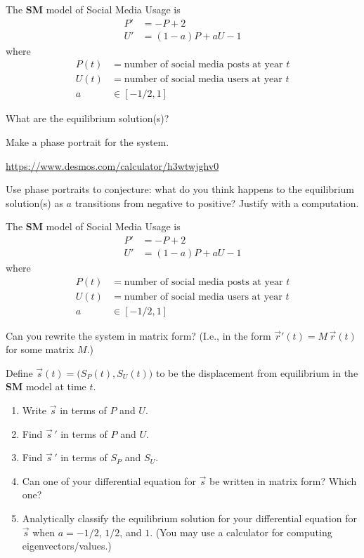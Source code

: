 \documentclass{workbook}
\begin{document}
\begin{slide}
	\question
	The \textbf{SM} model of Social Media Usage is
	\begin{align*}
		P'&=-P+2\\
		U'&=(1-a)P + aU - 1
	\end{align*}
	where
	\begin{align*}
		P(t) &= \text{number of social media posts at year $t$}\\
		U(t) &= \text{number of social media users at year $t$}\\
		a &\in [-1/2, 1]
	\end{align*}

	\begin{parts}
		\item What are the equilibrium solution(s)?
		\item Make a phase portrait for the system.
		
		{\small \url{https://www.desmos.com/calculator/h3wtwjghv0}}
		\item Use phase portraits to conjecture: what do you think happens to the equilibrium
			solution(s) as $a$ transitions from negative to positive? Justify with a computation.
	\end{parts}
\end{slide}

\begin{slide}
	\question
	The \textbf{SM} model of Social Media Usage is
	\begin{align*}
		P'&=-P+2\\
		U'&=(1-a)P + aU - 1
	\end{align*}
	where
	\begin{align*}
		P(t) &= \text{number of social media posts at year $t$}\\
		U(t) &= \text{number of social media users at year $t$}\\
		a &\in [-1/2, 1]
	\end{align*}

	\begin{parts}
		\item Can you rewrite the system in matrix form? (I.e., in the form $\vec r'(t) = M\, \vec r(t)$ for some matrix $M$.)
		\item Define $\vec s(t)=\Big(S_P(t),S_U(t)\Big)$  to be the displacement from equilibrium in the \textbf{SM} model at time $t$.
		\begin{enumerate}
			\item Write $\vec s$ in terms of $P$ and $U$.
			\item Find $\vec s\,'$ in terms of $P$ and $U$.
			\item Find $\vec s\,'$ in terms of $S_P$ and $S_U$.
			\item Can one of your differential equation for $\vec s$ be written in matrix form? Which one?
			\item Analytically classify the equilibrium solution for your differential equation for $\vec s$
				when $a=-1/2$, $1/2$, and $1$. (You may use a calculator for computing eigenvectors/values.)
		\end{enumerate}
	\end{parts}
\end{slide}
\end{document}
